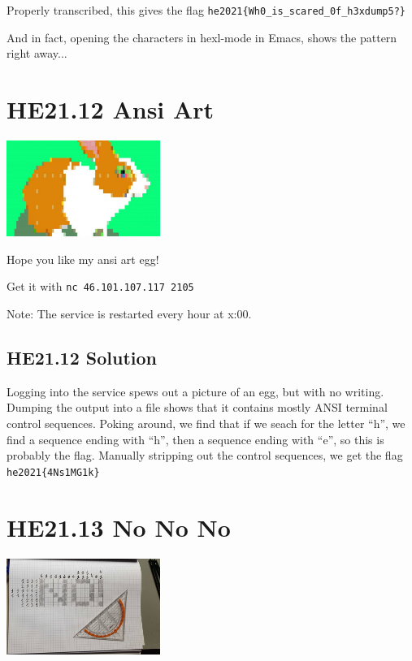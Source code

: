 \documentclass[english,a4paper,nols,noindent]{tufte-handout}
\begin{document}
Properly transcribed, this gives the flag \verb+he2021{Wh0_is_scared_0f_h3xdump5?}+

And in fact, opening the characters in hexl-mode in Emacs, shows the pattern right away...


\hypertarget{he21.12}{%
\section{HE21.12 Ansi Art}\label{he21.12}}
\begin{marginfigure}
    \includegraphics[width=50mm]{images/challenge12.jpg}
\end{marginfigure}

Hope you like my ansi art egg!

Get it with \verb+nc 46.101.107.117 2105+

Note: The service is restarted every hour at x:00.

\hypertarget{he21.12-solution}{%
\subsection{HE21.12 Solution}\label{he21.12-solution}}

Logging into the service spews out a picture of an egg, but with no
writing.  Dumping the output into a file shows that it contains mostly
ANSI terminal control sequences.  Poking around, we find that if we
seach for the letter ``h'', we find a sequence ending with ``h'', then
a sequence ending with ``e'', so this is probably the flag.  Manually
stripping out the control sequences, we get the flag
\verb+he2021{4Ns1MG1k}+


\hypertarget{he21.13}{%
  \section{HE21.13 No No No}
  \label{he21.13}}
\begin{marginfigure}
    \includegraphics[width=50mm]{images/challenge13.jpg}
\end{marginfigure}
\end{document}
